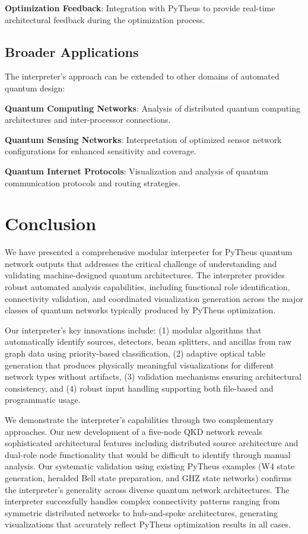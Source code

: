 \documentclass[11pt,a4paper]{article}
\begin{document}
\textbf{Optimization Feedback}: Integration with PyTheus to provide real-time architectural feedback during the optimization process.

\subsection{Broader Applications}

The interpreter's approach can be extended to other domains of automated quantum design:

\textbf{Quantum Computing Networks}: Analysis of distributed quantum computing architectures and inter-processor connections.

\textbf{Quantum Sensing Networks}: Interpretation of optimized sensor network configurations for enhanced sensitivity and coverage.

\textbf{Quantum Internet Protocols}: Visualization and analysis of quantum communication protocols and routing strategies.

\section{Conclusion}

We have presented a comprehensive modular interpreter for PyTheus quantum network outputs that addresses the critical challenge of understanding and validating machine-designed quantum architectures. The interpreter provides robust automated analysis capabilities, including functional role identification, connectivity validation, and coordinated visualization generation across the major classes of quantum networks typically produced by PyTheus optimization.

Our interpreter's key innovations include: (1) modular algorithms that automatically identify sources, detectors, beam splitters, and ancillas from raw graph data using priority-based classification, (2) adaptive optical table generation that produces physically meaningful visualizations for different network types without artifacts, (3) validation mechanisms ensuring architectural consistency, and (4) robust input handling supporting both file-based and programmatic usage.

We demonstrate the interpreter's capabilities through two complementary approaches. Our new development of a five-node QKD network reveals sophisticated architectural features including distributed source architecture and dual-role node functionality that would be difficult to identify through manual analysis. Our systematic validation using existing PyTheus examples (W4 state generation, heralded Bell state preparation, and GHZ state networks) confirms the interpreter's generality across diverse quantum network architectures. The interpreter successfully handles complex connectivity patterns ranging from symmetric distributed networks to hub-and-spoke architectures, generating visualizations that accurately reflect PyTheus optimization results in all cases.
\end{document}
